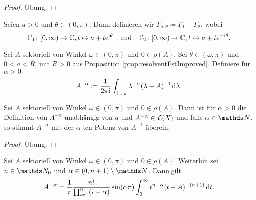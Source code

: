 \begin{proof}
  Übung.
\end{proof}

\begin{ntion}
  Seien $a > 0$ und $\theta \in (0,\pi)$.
  Dann definieren wir $\Gamma_{a,\theta} \coloneqq \Gamma_1 - \Gamma_2$, wobei
  $$
    \Gamma_1 \colon [0,\infty) \to \mathbb{C}, t \mapsto a + t\mathrm{e}^{\mathrm{i}\theta} \quad\text{und} \quad
    \Gamma_2 \colon [0,\infty) \to \mathbb{C}, t \mapsto a + t\mathrm{e}^{-\mathrm{i}\theta}.
  $$
\end{ntion}

\begin{defn}
  Sei $A$ sektoriell von Winkel $\omega \in (0,\pi)$ und $0 \in \rho(A)$.
  Sei $\theta \in (\omega,\pi)$ und $0 < a < R$, mit $R > 0$ aus Proposition \ref{prop:resolventEstImproved}.
  Definiere für $\alpha > 0$
  $$
  A^{-\alpha} \coloneqq \frac{1}{2\pi \mathrm{i}} \int_{\Gamma_{a,\theta}} \lambda^{-\alpha} (\lambda - A)^{-1} \, {\operatorname{d}\!{\lambda}}.
  $$
\end{defn}

\begin{prop}
  \label{prop:natPow}
  Sei $A$ sektoriell von Winkel $\omega \in (0,\pi)$ und $0 \in \rho(A)$.
  Dann ist für $\alpha > 0$ die Definition von $A^{-\alpha}$ unabhängig von $a$ und $A^{-\alpha} \in \mathcal{L}(X)$ und falls $\alpha \in \N$, so stimmt $A^{-\alpha}$ mit der $\alpha$-ten Potenz von $A^{-1}$ überein.
\end{prop}

\begin{proof}
  Übung.
\end{proof}

\begin{thm}
  \label{thm:negFracPower}
  Sei $A$ sektoriell von Winkel $\omega \in (0,\pi)$ und $0 \in \rho(A)$.
  Weiterhin sei $n \in \N_0$ und $\alpha \in (0,n+1) \setminus \N$.
  Dann gilt
  $$
  A^{-\alpha} = \frac{1}{\pi} \frac{n!}{\prod_{i = 1}^n(i - \alpha)} \sin(\alpha\pi) \int_0^\infty t^{n - \alpha} ( t + A)^{-(n+1)} \, {\operatorname{d}\!{t}}.
  $$
\end{thm}

